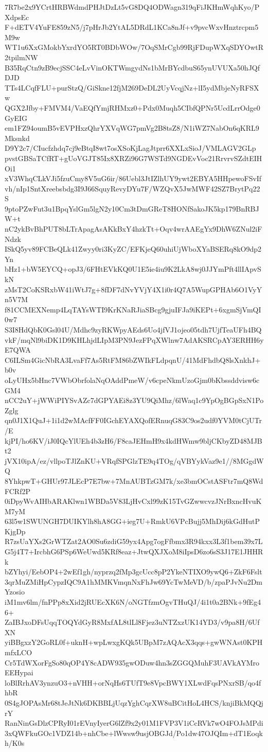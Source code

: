 7R7be2x9YCrtHRBWdmdPHJtDzLt5vG8DQ4ODWagn319qFiJKHmWqhKyo/PXdpsEc
F+dETV4YuFE859zN5/j7pHrJb2YtAL5DRdL1KCa8nJf+v9pvcWxvHnztrcpm5M9w
WT1u6XxGMokbYxrdYO5RT0BDbWOw/7OqSMrCgb99RjFDupWXqSDYOwtR2tpilmNW
B35RqCtn9zB9ecjSSC4eLvVinOKTWmgydNs1bMrBYcdbuS65ynUVUXa50hJQfDJD
TTs4LCqfFLU+purStzQ/GiSkne12fjM269DeDL2UyVcqjNz+lI5ydMbjeNyRFSXw
QGX2Jfby+FMVM4/VaEQfYmjRHMxz0+Pdx0Muqh5CIbfQPNr5UcdLrrOdge0GyEIG
em1FZ94oumB5vEVPHxzQhrYXVqWG7pmVg2B8tsZ8/N1iWZ7NabOn6qKRL9Mksnkd
D9Y2c7/CIucfzhdq7cj9eBtqI8wt7osXSoKjLagJtprr6XXLxSioJ/VMLAGV2GLp
pvstGBSaTCfRT+gUoVGJT85Ix8XRZi96G7WSTd9NGDEvVoc21RrvrvSZdtEIHOi1
xV3WhqCLkVJi5fzuCmy8V5uG6ir/86Uebl3JtIZlhUY9ywt2EBYA5HHpewoFSvIf
vh/nIp1SntXreebsbdg3I9J66SquyRevyDYu7F/WZQvX5JwMWF42SZ7BrytPq22S
9ptoPZwFut3u1BpqYslGm5lgN2y10Cm3tDmGReT8HONfSakoJK5kp179BnRBJW+t
nC2ykBvBhPUT8bLTrApagAsAKkBxY4hzkTt+Oqv4wrAAEgYx9DhW6ZNul2iFNdzk
ISkQ5yv89FCBeQLk41Zwyy0ri3KyZC/EFKjeQ60uhiUjWboXYaBSERq8kO9dp2Yn
bHz1+bW5EYCQ+opJ3/6FHtEVkKQ0U1E5ie4iu9K2LkA8wj0JJYmPft4llIApvSkN
zMsT2CoKSRxbW41iWtJ7g+8fDF7dNvYVjY4X1i0r4Q7A5WupGPHAb6O1VyYn5V7M
f81CCMEXNemp4LqTAYsWTI9KrKNaRJiaSBcg9gjuIFJa9iKEPt+6xgmSjVmQI0w7
S3I8HdQbK0Gsl04U/Mdhc9zyRKWpyAEds6Uo4jfVJ1ojeo05tdh7UjfTeaUFh4BQ
vkF/mqNl9biDK1D9KHLhjdLIpM3PN9JezFPqXWlnw7AdAKSRCpAY3ERHH6yE7QWA
C6ILSm4GicNbRA3LvaFf7As5RtFM86bZWIkFLdpqnU/41MdFhdbQ8lsXnkhJ+b0v
oLyUHx5bHnc7VWbObrfolaNqOAddPmeW/v6cpeNkmUzoGjm0bKbssddvisw6cGM4
nCC2uY+jWWiPIYSvAZc7dGPYAEi8z3YU9QiMhz/6lWaq1c9YpOgBGpSxN1PoZglg
qn0J1X1QuJ+1i1d2wMAcfFF0IGchEYAXQofERnuqG83C9os2udf0YVM0tCjUTr/E
kjPI/ho6KV/iJ0IQcYlUEh4b3zH6/F8caJEHmH9x4kdHWmw9bljCKbyZD48MJBt2
jVX10ipA/ez/vllpoTJlZnKU+VRqfSPGlzTE9q4TOg/qVBYykVaz9e1//8MGgdWQ
8YhkpwT+GHUr97JLEcP7E7bw+7MnAUBTzGM7k/xe3bmOCstASFtr7mQ8WdFCRf2P
0iDpyWvAIHbARAKlwn1WBDa5V83LjHvCxl99zK15TvGZwwcvzJNrBxncHvuKM7yM
63l5w1SWUNGH7DUIKYlh8hA8GG+ieg7U+RmkU6VPcBujj5MhDij6kGdHutPKjgDp
R7zsUaYXs2GrWTZat2AO0Su6zdiG59yx4Apg7ogFfbmx3R94kxx3L3f1bem39x7L
G5j4T7+IrcbhG6PSp6WeUwd5KRf8eaz+JtwQXJXoM8iIpsD6zo6sS3J17E1JHHRk
bZYhyi/EebOP4+2wEf1gh/nyprzq2fMp3gcUcc8pP2YkeNTIXO9ywQ6+ZkF6Fslt
3qrMuZMiHpCypzIQC9A1hMMKVmqnNxFhJw69YcTwMeVD/b/zpaPJvNu2DmYzosio
iM1mv6lm/fnPPp8xXid2jRUEcXK6N/oNGTfzmOgvTHuQJ/4i1t0a2BNk+9fEg46+
ZaIBJxoDFsUqqTOQYdGyR8MxfAL8tlLl8Fjez3uNTZxzUK14YD3/v9pa8H/6UfXN
yiBBgxzY2GoRL0f+uknH+wpLwxgKQk5UBpM7zAQAcX3qqs+gwWNAst0KPHmfxLCO
Cr5TdWXorFgSo80qOP4Y8cADW935gwODuw4hn3sZGGQMuhF3UAVkAYMroEEHypai
loBlRrhAV3ynzuO3+nVHH+orNqHs6TUfT9e8VpcBWY1XLwdFqsPNxrSB/qo4fhbR
0S4gJOPAsMr68tJeJtNk6DKBBLjUqzYghCqrXW8uBCitHoL4HCS/knjiBkMQQjrY
RanNinGsDlzCPRyI01rEVnyIyerG6lZf9x2y01M1FVP3V1iCcRVk7wO4FOJsMPdi
3xQWFkuGOc1VDZ14b+nhCbe+lWwsw9usjOBGJd/Po1dw47OJQIm+dT1Eoqkh/K0s
